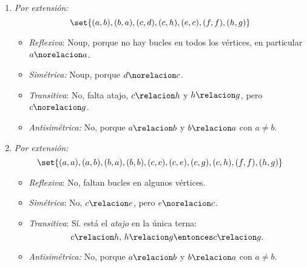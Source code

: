 \begin{enumerate}[label=\roman*)]

  \item
        \begin{minipage}{0.25\textwidth}
          \diecinuevei
        \end{minipage}
        \begin{minipage}{0.7\textwidth}
          \textit{Por extensión:}
          $$
            \set{(a,b),(b,a),(c,d),(c,h),(e,c),(f,f),(h,g)}
          $$
          \begin{itemize}
            \item \textit{Reflexiva}: Noup, porque no hay bucles en todos los vértices, en particular $a \norelacion a$.
            \item \textit{Simétrica:} Noup, porque $d \norelacion c$.
            \item \textit{Transitiva}: No, falta atajo, $c \relacion h$ y $h \relacion g$, pero $c \norelacion g$.
            \item \textit{Antisimétrica:} No, porque $a \relacion b$ y $b \relacion a$ con $a \neq b$.
          \end{itemize}
        \end{minipage}

        \bigskip

  \item
        \begin{minipage}{0.25\textwidth}
          \diecinueveii
        \end{minipage}
        \begin{minipage}{0.7\textwidth}
          \textit{Por extensión:}
          $$
            \set{(a,a),(a,b),(b,a),(b,b),(c,c),(c,e),(c,g),
              (c,h),(f,f),(h,g)}
          $$
          \begin{itemize}
            \item \textit{Reflexiva}: No, faltan bucles en algunos vértices.
            \item \textit{Simétrica}: No, $c \relacion e$, pero $e \norelacion c$.
            \item \textit{Transitiva}: Sí. está el \textit{atajo} en la única terna:
                  $$
                    c \relacion h,\, h \relacion g \entonces c \relacion g.
                  $$
            \item \textit{Antisimétrica:} No, porque $a \relacion b$ y $b \relacion a$ con $a \neq b$.
          \end{itemize}
        \end{minipage}


\end{enumerate}
